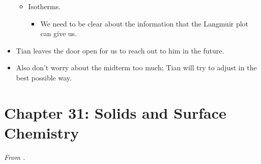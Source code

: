 \documentclass[../notes.tex]{subfiles}
\begin{document}
\begin{itemize}
\begin{itemize}
        \item Isotherms.
        \begin{itemize}
            \item We need to be clear about the information that the Langmuir plot can give us.
        \end{itemize}
    \end{itemize}
    \item Tian leaves the door open for us to reach out to him in the future.
    \item Also don't worry about the midterm too much; Tian will try to adjust in the best possible way.
\end{itemize}



\section{Chapter 31: Solids and Surface Chemistry}
\emph{From \textcite{bib:McQuarrieSimon}.}
\end{document}
